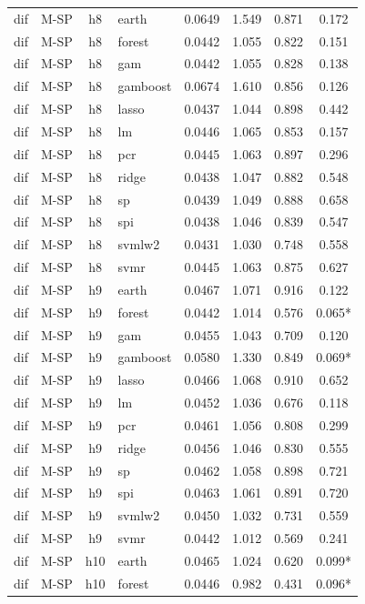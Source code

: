 \begin{ThreePartTable}
\begin{longtable}[t]{llclcccc}
\addlinespace
dif & M-SP & h8 & earth & 0.0649 & 1.549 & 0.871 & 0.172\\
dif & M-SP & h8 & forest & 0.0442 & 1.055 & 0.822 & 0.151\\
dif & M-SP & h8 & gam & 0.0442 & 1.055 & 0.828 & 0.138\\
dif & M-SP & h8 & gamboost & 0.0674 & 1.610 & 0.856 & 0.126\\
dif & M-SP & h8 & lasso & 0.0437 & 1.044 & 0.898 & 0.442\\
dif & M-SP & h8 & lm & 0.0446 & 1.065 & 0.853 & 0.157\\
dif & M-SP & h8 & pcr & 0.0445 & 1.063 & 0.897 & 0.296\\
dif & M-SP & h8 & ridge & 0.0438 & 1.047 & 0.882 & 0.548\\
dif & M-SP & h8 & sp & 0.0439 & 1.049 & 0.888 & 0.658\\
dif & M-SP & h8 & spi & 0.0438 & 1.046 & 0.839 & 0.547\\
dif & M-SP & h8 & svmlw2 & 0.0431 & 1.030 & 0.748 & 0.558\\
dif & M-SP & h8 & svmr & 0.0445 & 1.063 & 0.875 & 0.627\\
\addlinespace
dif & M-SP & h9 & earth & 0.0467 & 1.071 & 0.916 & 0.122\\
dif & M-SP & h9 & forest & 0.0442 & 1.014 & 0.576 & 0.065*\\
dif & M-SP & h9 & gam & 0.0455 & 1.043 & 0.709 & 0.120\\
dif & M-SP & h9 & gamboost & 0.0580 & 1.330 & 0.849 & 0.069*\\
dif & M-SP & h9 & lasso & 0.0466 & 1.068 & 0.910 & 0.652\\
dif & M-SP & h9 & lm & 0.0452 & 1.036 & 0.676 & 0.118\\
dif & M-SP & h9 & pcr & 0.0461 & 1.056 & 0.808 & 0.299\\
dif & M-SP & h9 & ridge & 0.0456 & 1.046 & 0.830 & 0.555\\
dif & M-SP & h9 & sp & 0.0462 & 1.058 & 0.898 & 0.721\\
dif & M-SP & h9 & spi & 0.0463 & 1.061 & 0.891 & 0.720\\
dif & M-SP & h9 & svmlw2 & 0.0450 & 1.032 & 0.731 & 0.559\\
dif & M-SP & h9 & svmr & 0.0442 & 1.012 & 0.569 & 0.241\\
\addlinespace
dif & M-SP & h10 & earth & 0.0465 & 1.024 & 0.620 & 0.099*\\
dif & M-SP & h10 & forest & 0.0446 & 0.982 & 0.431 & 0.096*\\

\end{longtable}
\end{ThreePartTable}
